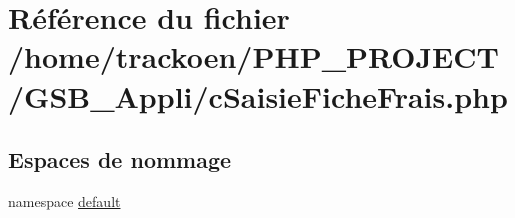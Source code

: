 \hypertarget{c_saisie_fiche_frais_8php}{\section{Référence du fichier /home/trackoen/\-P\-H\-P\-\_\-\-P\-R\-O\-J\-E\-C\-T/\-G\-S\-B\-\_\-\-Appli/c\-Saisie\-Fiche\-Frais.php}
\label{c_saisie_fiche_frais_8php}
}
\subsection*{Espaces de nommage}
\begin{DoxyCompactItemize}
\item 
namespace \hyperlink{namespacedefault}{default}
\end{DoxyCompactItemize}
